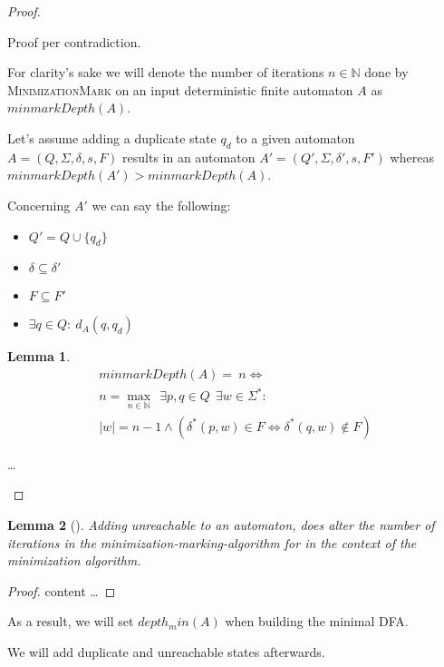 \documentclass[a4paper, oneside, 11pt]{report}
\newtheorem{lemma}{Lemma}
\theoremstyle{definition}
\theoremstyle{remark}
\begin{document}
\begin{proof}
	\begin{description}
		\item
		
		Proof per contradiction.
		
		For clarity's sake we will denote the number of iterations $n \in \mathbb{N}$ done by \textsc{MinimizationMark} on an input deterministic finite automaton $A$ as $minmarkDepth(A)$.
		
		Let's assume adding a duplicate state $q_d$ to a given automaton $A = (Q, \Sigma, \delta, s, F)$ results in an automaton $A' = (Q', \Sigma, \delta', s, F')$ whereas $minmarkDepth(A') > minmarkDepth(A)$.
		
		Concerning $A'$ we can say the following:
		\begin{itemize}
			\item $Q' = Q \cup \{ q_d \}$
			\item $\delta \subseteq \delta'$
			\item $F \subseteq F'$
			\item $\exists q \in Q \colon\ d_A(q, q_d)$
		\end{itemize}
		
		\begin{lemma}
			\begin{multline*}
				minmarkDepth(A) =\ n \Leftrightarrow \\
				n = \max_{n \in \mathbb{N}}\ \ \exists p, q \in Q\ \ \exists w \in \Sigma^* \colon \\
				|w| = n - 1 \land (\delta^*(p,w) \in F \Leftrightarrow \delta^*(q,w) \notin F)
			\end{multline*}
		\end{lemma}
	
		\ldots
	\end{description}
\end{proof}

\begin{lemma}[]
	Adding unreachable to an automaton, does alter the number of iterations in the minimization-marking-algorithm for in the context of the minimization algorithm.
\end{lemma}

\begin{proof}
	content \ldots
\end{proof}

As a result, we will set $depth_min(A)$ when building the minimal DFA.

We will add duplicate and unreachable states afterwards.
\end{document}
